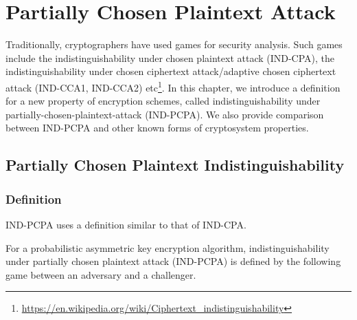 \chapter{Partially Chosen Plaintext Attack}\label{ch:pcpa}

Traditionally, cryptographers have used games for security analysis. Such games
include the indistinguishability under chosen plaintext attack (IND-CPA), the
indistinguishability under chosen ciphertext attack/adaptive chosen ciphertext
attack (IND-CCA1, IND-CCA2)
etc\footnote{\url{https://en.wikipedia.org/wiki/Ciphertext_indistinguishability}}.
In this chapter, we introduce a definition for a new property of encryption
schemes, called indistinguishability under partially-chosen-plaintext-attack
(IND-PCPA). We also provide comparison between IND-PCPA and other known forms of
cryptosystem properties.

\section{Partially Chosen Plaintext Indistinguishability}\label{sec:indpcpa}

\subsection{Definition}

IND-PCPA uses a definition similar to that of IND-CPA.

For a probabilistic asymmetric key encryption algorithm, indistinguishability
under partially chosen plaintext attack (IND-PCPA) is defined by the following
game between an adversary and a challenger.

